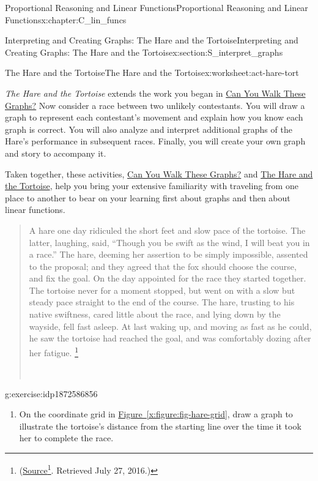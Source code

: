 \documentclass[oneside,10pt,]{book}
\newcommand{\xreffont}{\relax}
\newcommand{\pubtitle}[1]{\textsl{#1}}
\numberwithin{equation}{chapter}
\begin{document}
\begin{chapterptx}{Proportional Reasoning and Linear Functions}{}{Proportional Reasoning and Linear Functions}{}{}{x:chapter:C_lin_funcs}
\begin{sectionptx}{Interpreting and Creating Graphs: The Hare and the Tortoise}{}{Interpreting and Creating Graphs: The Hare and the Tortoise}{}{}{x:section:S_interpret_graphs}
\begin{worksheet-subsection}{The Hare and the Tortoise}{}{The Hare and the Tortoise}{}{}{x:worksheet:act-hare-tort}
\begin{introduction}{}
\pubtitle{The Hare and the Tortoise} extends the work you began in \hyperref[x:worksheet:act-walk-graphs]{Can You Walk These Graphs?} Now consider a race between two unlikely contestants. You will draw a graph to represent each contestant's movement and explain how you know each graph is correct. You will also analyze and interpret additional graphs of the Hare's performance in subsequent races. Finally, you will create your own graph and story to accompany it.%
\par
Taken together, these activities, \hyperref[x:worksheet:act-walk-graphs]{Can You Walk These Graphs?} and \hyperref[x:worksheet:act-hare-tort]{The Hare and the Tortoise}, help you bring your extensive familiarity with traveling from one place to another to bear on your learning first about graphs and then about linear functions. \begin{quote}%
A hare one day ridiculed the short feet and slow pace of the tortoise. The latter, laughing, said, ``Though you be swift as the wind, I will beat you in a race.'' The hare, deeming her assertion to be simply impossible, assented to the proposal; and they agreed that the fox should choose the course, and fix the goal. On the day appointed for the race they started together. The tortoise never for a moment stopped, but went on with a slow but steady pace straight to the end of the course. The hare, trusting to his native swiftness, cared little about the race, and lying down by the wayside, fell fast asleep. At last waking up, and moving as fast as he could, he saw the tortoise had reached the goal, and was comfortably dozing after her fatigue. \footnote{(\href{http://www.pitt.edu/\~dash/type0275.html\#townsend}{Source}\footnote{\nolinkurl{pitt.edu/\~dash/type0275.html\#townsend}\label{g:fn:idp1872582120}}. Retrieved July 27, 2016.)\label{g:fn:idp1872581608}}%
\nopagebreak\par%
\hfill{}\\\par
\end{quote}
%
\end{introduction}%
\begin{divisionexercise}{1}{}{}{g:exercise:idp1872586856}%
\begin{enumerate}[font=\bfseries,label=(\alph*),ref=\alph*]
\item{}On the coordinate grid in \hyperref[x:figure:fig-hare-grid]{Figure~{\xreffont\ref{x:figure:fig-hare-grid}}}, draw a graph to illustrate the tortoise's distance from the starting line over the time it took her to complete the race.%

\end{enumerate}
\end{divisionexercise}
\end{worksheet-subsection}
\end{sectionptx}
\end{chapterptx}
\end{document}
